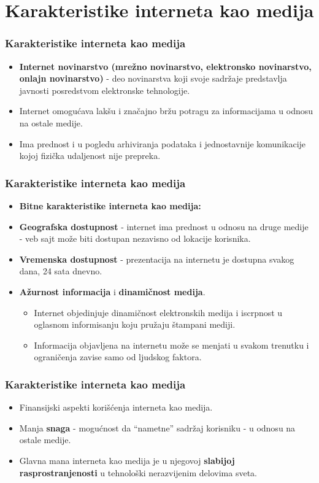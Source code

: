 \documentclass{beamer}
\begin{document}
\section{Karakteristike interneta kao medija}
\begin{frame}[fragile]\frametitle{Karakteristike interneta kao medija}
\transboxin
	\begin{itemize}	
		\item {\bf Internet novinarstvo (mrežno novinarstvo,
elektronsko novinarstvo, onlajn novinarstvo)} - deo novinarstva koji svoje sadržaje predstavlja javnosti posredstvom elektronske tehnologije.
        \item Internet omogućava lakšu i značajno bržu potragu za informacijama u odnosu na ostale medije. 
        \item Ima prednost i u pogledu arhiviranja podataka i jednostavnije komunikacije kojoj fizička udaljenost nije prepreka.
	\end{itemize}
\end{frame}
\begin{frame}[fragile]\frametitle{Karakteristike interneta kao medija}
\transboxin
	\begin{itemize} 
        \item {\bf Bitne karakteristike interneta kao medija:}
        \newline
        \item {\bf Geografska dostupnost} - internet ima prednost u odnosu na druge medije - veb sajt može biti dostupan nezavisno od lokacije korisnika.
        \item {\bf Vremenska dostupnost} - prezentacija na internetu je dostupna svakog dana, 24 sata dnevno.
        \item {\bf Ažurnost informacija} i {\bf dinamičnost medija}.
        \begin{itemize}
            \item Internet objedinjuje dinamičnost elektronskih medija i iscrpnost u oglasnom informisanju koju pružaju štampani mediji.
            \item Informacija objavljena na internetu može se menjati u svakom trenutku i ograničenja zavise samo od ljudskog faktora.
            \end{itemize}
	\end{itemize}
\end{frame}

\begin{frame}[fragile]\frametitle{Karakteristike interneta kao medija}
\transboxin
	\begin{itemize} 
        \item Finansijski aspekti korišćenja interneta kao medija.
        \item Manja {\bf snaga} - mogućnost da “nametne” sadržaj korisniku - u odnosu na ostale medije.
        \item Glavna mana interneta kao medija je u njegovoj {\bf slabijoj rasprostranjenosti} u tehnološki nerazvijenim delovima sveta.
	\end{itemize}
\end{frame}
\end{document}

